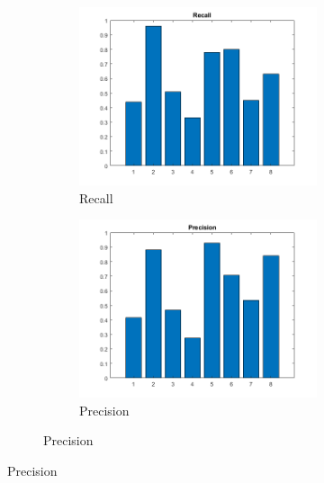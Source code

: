 \begin{figure}[h]
	\centering
	\begin{subfigure}{0.3\textwidth}
		\begin{subfigure}[t]{\textwidth}
			\includegraphics[width=\textwidth]{figures/recall_75C_3NN_2S.png} 
			\caption{Recall}
		\end{subfigure}
		\begin{subfigure}[t]{\textwidth}
			\includegraphics[width=\textwidth]{figures/precision_75C_3NN_2S.png}
			\caption{Precision}
		\end{subfigure}


\end{subfigure}
\end{figure}
